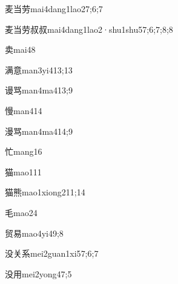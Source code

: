 \begin{verbete}{麦当劳}{mai4dang1lao2}{7;6;7}
\end{verbete}
\begin{verbete}{麦当劳叔叔}{mai4dang1lao2·shu1shu5}{7;6;7;8;8}
\end{verbete}
\begin{verbete}{卖}{mai4}{8}
\end{verbete}
\begin{verbete}{满意}{man3yi4}{13;13}
\end{verbete}
\begin{verbete}{谩骂}{man4ma4}{13;9}
\end{verbete}
\begin{verbete}{慢}{man4}{14}
\end{verbete}
\begin{verbete}{漫骂}{man4ma4}{14;9}
\end{verbete}
\begin{verbete}{忙}{mang1}{6}
\end{verbete}
\begin{verbete}{猫}{mao1}{11}
\end{verbete}
\begin{verbete}{猫熊}{mao1xiong2}{11;14}
\end{verbete}
\begin{verbete}{毛}{mao2}{4}
\end{verbete}
\begin{verbete}{贸易}{mao4yi4}{9;8}
\end{verbete}
\begin{verbete}{没关系}{mei2guan1xi5}{7;6;7}
\end{verbete}
\begin{verbete}{没用}{mei2yong4}{7;5}
\end{verbete}
